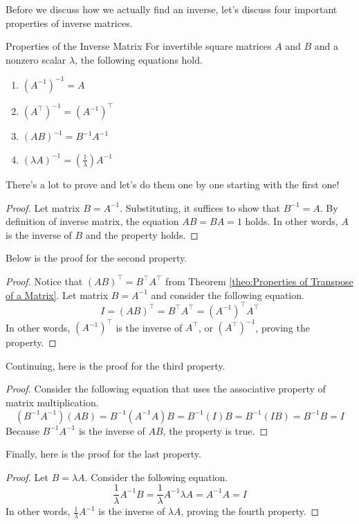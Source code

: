 \documentclass[../main.tex]{subfiles}
\begin{document}
Before we discuss how we actually find an inverse, let's discuss
four important properties of inverse matrices.

\begin{theorem}{}{Properties of the Inverse Matrix}
For invertible square matrices $A$ and $B$ and a nonzero scalar
$\lambda$, the following equations hold.
\begin{enumerate}
\item $(A^{-1})^{-1} = A$
\item $(A^\intercal)^{-1} = (A^{-1})^\intercal$
\item $(AB)^{-1} = B^{-1}A^{-1}$
\item $(\lambda A)^{-1} = (\frac{1}{\lambda})A^{-1}$
\end{enumerate}
\end{theorem}

There's a lot to prove and let's do them one by one starting with
the first one!

\begin{proof}
Let matrix $B = A^{-1}$. Substituting, it suffices to show that
$B^{-1} = A$. By definition of inverse matrix, the equation
$AB = BA = 1$ holds. In other words, $A$ is the inverse of $B$
and the property holds.
\end{proof}

Below is the proof for the second property.

\begin{proof}
Notice that $(AB)^\intercal = B^\intercal A^\intercal$ from
Theorem \ref{theo:Properties of Transpose of a Matrix}. Let matrix
$B = A^{-1}$ and consider the following equation.
\[
I
= (AB)^\intercal
= B^\intercal A^\intercal
= \left( A^{-1} \right)^\intercal A^\intercal
\]
In other words, $(A^{-1})^\intercal$ is the inverse of $A^\intercal$,
or $(A^\intercal)^{-1}$, proving the property.
\end{proof}

Continuing, here is the proof for the third property.

\begin{proof}
Consider the following equation that uses the associative property
of matrix multiplication.
\[
(B^{-1}A^{-1})(AB)
= B^{-1}(A^{-1}A)B
= B^{-1}(I)B
= B^{-1}(IB)
= B^{-1}B
= I
\]
Because $B^{-1}A^{-1}$ is the inverse of $AB$, the property is true.
\end{proof}

Finally, here is the proof for the last property.

\begin{proof}
Let $B = \lambda A$. Consider the following equation.
\[
\frac{1}{\lambda} A^{-1} B
= \frac{1}{\lambda} A^{-1} \lambda A
= A^{-1} A
= I
\]
In other words, $\frac{1}{\lambda} A^{-1}$ is the inverse of
$\lambda A$, proving the fourth property.
\end{proof}
\end{document}
